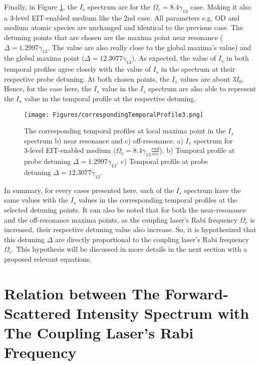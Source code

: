Finally, in Figure \ref{fig: corresponding temporal profile 3}, the $I_{s}$ spectrum are for the $\Omega_{c} = 8.4\gamma_{13}$ case. Making it also a 3-level EIT-enabled medium like the 2nd case. All parameters e.g. OD and medium atomic species are unchanged and identical to the previous case. The detuning points that are chosen are the maxima point near resonance ($\Delta = 1.2997\gamma_{13}$. The value are also really close to the global maxima's value) and the global maxima point ($\Delta = 12.3077\gamma_{13}$). As expected, the value of $I_{s}$ in both temporal profiles agree closely with the value of $I_{s}$ in the spectrum at their respective probe detuning. At both chosen points, the $I_{s}$ values are about $3I_{0}$. Hence, for the case here, the $I_{s}$ value in the $I_{s}$ spectrum are also able to represent the $I_{s}$ value in the temporal profile at the respective detuning.

\begin{figure}[h!]
    \centering
    \texttt{[image: Figures/correspondingTemporalProfile3.png]}
    \caption{The corresponding temporal profiles at local maxima point in the $I_{s}$ spectrum b) near resonance and c) off-resonance. a) $I_{s}$ spectrum for 3-level EIT-enabled medium ($\Omega_{c} = 8.4\gamma_{13} \frac{rad}{sec}$). b)  Temporal profile at probe detuning $\Delta = 1.2997\gamma_{13}$. c) Temporal profile at probe detuning $\Delta = 12.3077\gamma_{13}$.}
    \label{fig: corresponding temporal profile 3}
\end{figure}

In summary, for every cases presented here, each of the $I_{s}$ spectrum have the same values with the $I_{s}$ values in the corresponding temporal profiles at the selected detuning points. It can also be noted that for both the near-resonance and the off-resonance maxima points, as the coupling laser's Rabi frequency $\Omega_{c}$ is increased, their respective detuning value also increase. So, it is hypothesized that this detuning $\Delta$ are directly proportional to the coupling laser's Rabi frequency $\Omega_{c}$. This hypothesis will be discussed in more details in the next section with a proposed relevant equations.


\section{Relation between The Forward-Scattered Intensity Spectrum with The Coupling Laser's Rabi Frequency}


